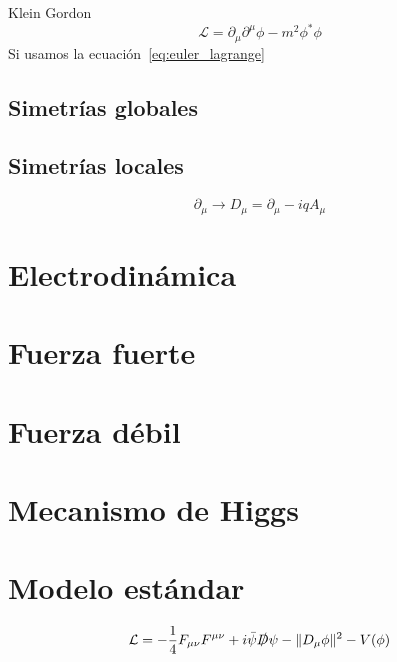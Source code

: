 \documentclass[a4paper]{article}
\newcommand{\Lagr}{\mathcal{L}}
\newcommand{\du}{\partial}
\begin{document}
\noindent Klein Gordon
\begin{equation}
\Lagr = \du_\mu \du^\mu \phi - m^2 \phi^* \phi
\end{equation}
Si usamos la ecuación~\ref{eq:euler_lagrange}


\subsection{Simetrías globales}\label{ sec:simetras-globales}


\subsection{Simetrías locales}\label{ sec:simetras-locales}

\begin{equation}
\du_\mu \to D_\mu = \du_\mu - i q A_\mu
\end{equation}


\section{Electrodinámica}\label{ sec:electrodinamica}


\section{Fuerza fuerte}\label{ sec:fuerza-fuerte}


\section{Fuerza débil}\label{ sec:fuerza-debil}


\section{Mecanismo de Higgs}\label{ sec:mecanismo-de-higgs}


\section{Modelo estándar}\label{ sec:modelo-estandar}
\[
 \Lagr = - \frac{1}{4} F_{\mu \nu} F^{\mu \nu} + i \bar{\psi} \slashed{D} \psi - \|D_\mu \phi\|^2 - V(\phi) 
\]



\nocite{*}


\end{document}
